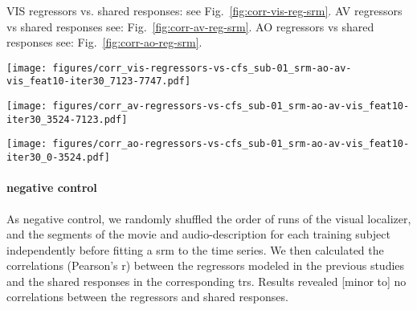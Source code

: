 
%
VIS regressors vs. shared responses: see Fig.~\ref{fig:corr-vis-reg-srm}.
%
AV regressors vs shared responses see: Fig.~\ref{fig:corr-av-reg-srm}.
%
AO regressors vs shared responses see: Fig.~\ref{fig:corr-ao-reg-srm}.



\begin{figure*}[tbp]
\centering
\texttt{[image: figures/corr\_vis-regressors-vs-cfs\_sub-01\_srm-ao-av-vis\_feat10-iter30\_7123-7747.pdf]}
    \caption{
    \textbf{Correlations of regressors of visual localizer and shared responses.
    }
    Lore ipsum.
}
    \label{fig:corr-vis-reg-srm}
\end{figure*}



\begin{figure*}[tbp]
\centering
    \texttt{[image: figures/corr\_av-regressors-vs-cfs\_sub-01\_srm-ao-av-vis\_feat10-iter30\_3524-7123.pdf]}
    \caption{
    \textbf{Correlations of regressors of movie and shared responses.}
    Lore ipsum.
    }
    \label{fig:corr-av-reg-srm}
\end{figure*}



\begin{figure*}[tbp]
\centering
    \texttt{[image: figures/corr\_ao-regressors-vs-cfs\_sub-01\_srm-ao-av-vis\_feat10-iter30\_0-3524.pdf]}
    \caption{
    \textbf{Correlations of regressors of audio-description and shared
    responses.}
    Pearson correlation coefficients of regressors used in the analysis of
    audio-description to model shared responses (sh. res.) correlating with
    nouns spoken by the
    narrator and features of the \ac{srm} (i.e. shared responses).
    \texttt{geo\&groom} \texttt{geo\&groom\&furn} are combination of regressors
    (as used on the positive side of contrasts).
    The time series of the \ac{srm} were sliced to match the TRs of the
    audio-description.
    }
    \label{fig:corr-ao-reg-srm}
\end{figure*}



\paragraph{negative control}


As negative control, we randomly shuffled the order of runs of the visual
localizer, and the segments of the movie and audio-description for each training
subject independently before fitting a \ac{srm} to the time series.
We then calculated the correlations (Pearson's r) between the regressors modeled
in the previous studies and the shared responses in the corresponding \acp{tr}.
Results revealed [minor to] no correlations between the regressors and shared
responses.


